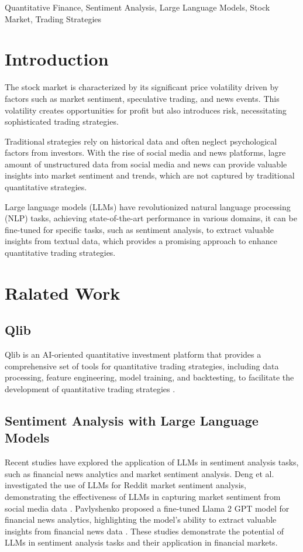 \documentclass[conference]{IEEEtran}
\begin{document}
\begin{IEEEkeywords}
Quantitative Finance, Sentiment Analysis, Large Language Models, Stock Market, Trading Strategies
\end{IEEEkeywords}

\section{\textbf{Introduction}}

The stock market is characterized by its significant price volatility driven by factors such as market sentiment, speculative trading, and news events. 
This volatility creates opportunities for profit but also introduces risk, necessitating sophisticated trading strategies.

Traditional strategies rely on historical data and often neglect psychological factors from investors. 
With the rise of social media and news platforms, lagre amount of unstructured data from social media and news can provide valuable insights into market sentiment and trends, which are not captured by traditional quantitative strategies.

Large language models (LLMs) have revolutionized natural language processing (NLP) tasks, achieving state-of-the-art performance in various domains, it can be fine-tuned for specific tasks, such as sentiment analysis, to extract valuable insights from textual data, which provides a promising approach to enhance quantitative trading strategies.

\section{\textbf{Ralated Work}}

\subsection{\textbf{Qlib}}
Qlib is an AI-oriented quantitative investment platform that provides a comprehensive set of tools for quantitative trading strategies, including data processing, feature engineering, model training, and backtesting, to facilitate the development of quantitative trading strategies \cite{yang2020}.

\subsection{\textbf{Sentiment Analysis with Large Language Models}}
Recent studies have explored the application of LLMs in sentiment analysis tasks, such as financial news analytics and market sentiment analysis.
Deng et al. investigated the use of LLMs for Reddit market sentiment analysis, demonstrating the effectiveness of LLMs in capturing market sentiment from social media data \cite{deng2023}.
Pavlyshenko proposed a fine-tuned Llama 2 GPT model for financial news analytics, highlighting the model's ability to extract valuable insights from financial news data \cite{pavlyshenko2023}.
These studies demonstrate the potential of LLMs in sentiment analysis tasks and their application in financial markets.
\end{document}
